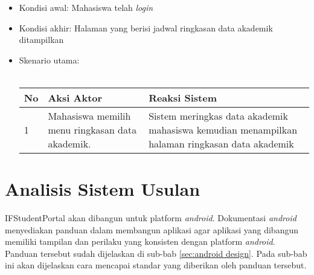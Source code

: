 \begin{enumerate}
\begin{itemize}
			\item Kondisi awal: Mahasiswa telah \textit{login}
			\item Kondisi akhir: Halaman yang berisi jadwal ringkasan data akademik ditampilkan
			\item Skenario utama: \\ \\
			\begin{tabular}{|p{0.5cm} |p{6cm}| p{6cm}|}
						\hline
							No 	& Aksi Aktor & Reaksi Sistem \\ \hline
							1 	& Mahasiswa memilih menu ringkasan data akademik. 	&	Sistem meringkas data akademik mahasiswa kemudian menampilkan halaman ringkasan data akademik \\ \hline 
						\end{tabular} 
		\end{itemize}
\end{enumerate}


\section{Analisis Sistem Usulan}
IFStudentPortal akan dibangun untuk platform \textit{android}. Dokumentasi \textit{android} menyediakan panduan dalam membangun aplikasi agar aplikasi yang dibangun memiliki tampilan dan perilaku yang konsisten dengan platform \textit{android}. Panduan tersebut sudah dijelaskan di sub-bab \ref{sec:android design}. Pada sub-bab ini akan dijelaskan cara mencapai standar yang diberikan oleh panduan tersebut.

